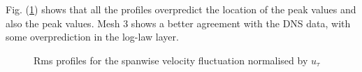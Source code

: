 Fig. (\ref{wrms wale}) shows that all the profiles overpredict the location of the peak values and also the peak values. Mesh 3 shows a better agreement with the DNS data, with some overprediction in the log-law layer.
%
\begin{figure}[h!]
\begin{minipage}[b]{0.5\textwidth}
\end{minipage}
%
\begin{minipage}[b]{0.5\textwidth}
\end{minipage}
\caption{Rms profiles for the spanwise velocity fluctuation normalised by $u_\tau$}
\label{wrms wale}
\end{figure}
